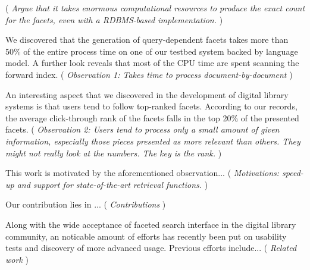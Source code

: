 
({ \it
Argue that it takes enormous computational resources to produce the exact count
for the facets, even with a RDBMS-based implementation. })

We discovered that the generation of query-dependent facets takes more than
50\% of the entire process time on one of our testbed system backed by language
model.  A further look reveals that most of the CPU time are spent scanning the
forward index. ({ \it Observation 1: Takes time to process document-by-document })

An interesting aspect that we discovered in the development of digital library
systems is that users tend to follow top-ranked facets.  According to our
records, the average click-through rank of the facets falls in the top 20\% of
the presented facets. ({ \it Observation 2: Users tend to process only a small
amount of given information, especially those pieces presented as more relevant
than others.  They might not really look at the numbers.  The key is the rank.
})

This work is motivated by the aforementioned observation... ({ \it Motivations:
speed-up and support for state-of-the-art retrieval functions.  })

Our contribution lies in ... ({ \it Contributions })

Along with the wide acceptance of faceted search interface in the digital
library community, an noticable amount of efforts has recently been put on
usability tests and discovery of more advanced usage.  Previous efforts
include... ({ \it Related work })

